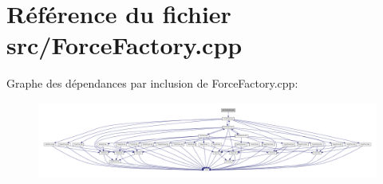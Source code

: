 \section{Référence du fichier src/\-Force\-Factory.cpp}
\label{_force_factory_8cpp}
Graphe des dépendances par inclusion de Force\-Factory.\-cpp\-:\nopagebreak
\begin{figure}[H]
\begin{center}
\leavevmode
\includegraphics[width=350pt]{_force_factory_8cpp__incl}
\end{center}
\end{figure}

